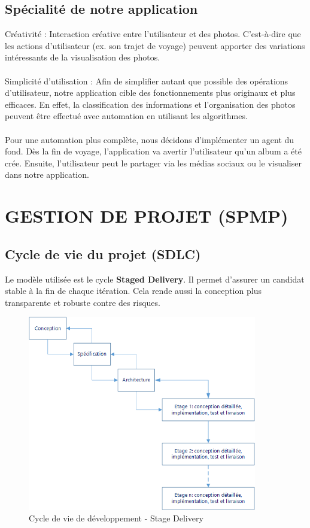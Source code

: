 \documentclass{article}
\begin{document}
\subsection{\Large  Spécialité de notre application}
Créativité : Interaction créative entre l’utilisateur et des photos. C’est-à-dire que les actions d’utilisateur (ex. son trajet de voyage) peuvent apporter des variations intéressants de la visualisation des photos.\\\\
Simplicité d’utilisation : Afin de simplifier autant que possible des opérations d’utilisateur,  notre application cible des fonctionnements plus originaux et plus efficaces. En effet, la classification des informations et l’organisation des photos peuvent être effectué avec automation en utilisant les algorithmes. 
\\\\Pour une automation plus complète, nous décidons d'implémenter un agent du fond. Dès la fin de voyage, l'application va avertir l'utilisateur qu'un album a été crée. Ensuite, l'utilisateur peut le partager via les médias sociaux ou le visualiser dans notre application.


\newpage
\section{\LARGE GESTION DE PROJET (SPMP)}

\subsection{\Large Cycle de vie du projet (SDLC)}
Le modèle utilisée est  le cycle \textbf{Staged Delivery}. Il permet d'assurer un candidat stable à la fin de chaque itération. Cela rende aussi la conception plus transparente et robuste contre des risques.
\begin{figure}[h!]
\centering
\includegraphics[width=100mm]{SDLC.png}
\caption{Cycle de vie de développement - Stage Delivery}
\end{figure}
\end{document}
